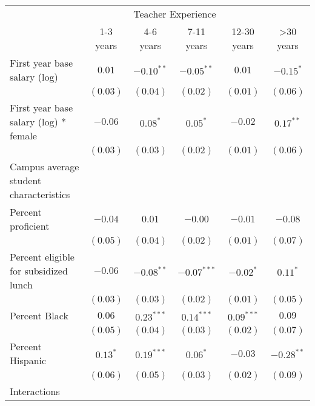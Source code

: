 \documentclass[12pt,]{article}
\begin{document}
\begin{table}
\begin{center}
\begin{tabular}{l c c c c c }
\hline
 & \multicolumn{4}{c}{Teacher Experience} \\ \cline{2-6}
 & 1-3 years & 4-6 years & 7-11 years & 12-30 years & >30 years \\
\hline
First year base salary (log)                & $0.01$       & $-0.10^{**}$ & $-0.05^{**}$  & $0.01$       & $-0.15^{*}$  \\
                                            & $(0.03)$     & $(0.04)$     & $(0.02)$      & $(0.01)$     & $(0.06)$     \\
First year base salary (log) * female       & $-0.06$      & $0.08^{*}$   & $0.05^{*}$    & $-0.02$      & $0.17^{**}$  \\
                                            & $(0.03)$     & $(0.03)$     & $(0.02)$      & $(0.01)$     & $(0.06)$     \\
Campus average student characteristics      &              &              &               &              &              \\
\quad Percent proficient                    & $-0.04$      & $0.01$       & $-0.00$       & $-0.01$      & $-0.08$      \\
                                            & $(0.05)$     & $(0.04)$     & $(0.02)$      & $(0.01)$     & $(0.07)$     \\
\quad Percent eligible for subsidized lunch & $-0.06$      & $-0.08^{**}$ & $-0.07^{***}$ & $-0.02^{*}$  & $0.11^{*}$   \\
                                            & $(0.03)$     & $(0.03)$     & $(0.02)$      & $(0.01)$     & $(0.05)$     \\
\quad Percent Black                         & $0.06$       & $0.23^{***}$ & $0.14^{***}$  & $0.09^{***}$ & $0.09$       \\
                                            & $(0.05)$     & $(0.04)$     & $(0.03)$      & $(0.02)$     & $(0.07)$     \\
\quad Percent Hispanic                      & $0.13^{*}$   & $0.19^{***}$ & $0.06^{*}$    & $-0.03$      & $-0.28^{**}$ \\
                                            & $(0.06)$     & $(0.05)$     & $(0.03)$      & $(0.02)$     & $(0.09)$     \\
Interactions                                &              &              &               &              &              \\

\end{tabular}
\end{center}
\end{table}
\end{document}
